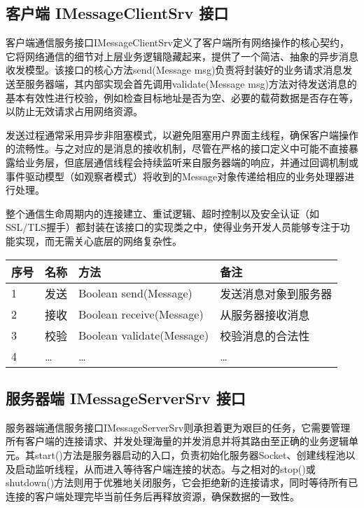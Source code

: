 \documentclass[a4paper]{ctexart}
\begin{document}
\subsection{客户端 IMessageClientSrv 接口}
客户端通信服务接口IMessageClientSrv定义了客户端所有网络操作的核心契约，它将网络通信的细节对上层业务逻辑隐藏起来，提供了一个简洁、抽象的异步消息收发模型。该接口的核心方法send(Message msg)负责将封装好的业务请求消息发送至服务器端，其内部实现会首先调用validate(Message msg)方法对待发送消息的基本有效性进行校验，例如检查目标地址是否为空、必要的载荷数据是否存在等，以防止无效请求占用网络资源。

发送过程通常采用异步非阻塞模式，以避免阻塞用户界面主线程，确保客户端操作的流畅性。与之对应的是消息的接收机制，尽管在严格的接口定义中可能不直接暴露给业务层，但底层通信线程会持续监听来自服务器端的响应，并通过回调机制或事件驱动模型（如观察者模式）将收到的Message对象传递给相应的业务处理器进行处理。

整个通信生命周期内的连接建立、重试逻辑、超时控制以及安全认证（如SSL/TLS握手）都封装在该接口的实现类之中，使得业务开发人员能够专注于功能实现，而无需关心底层的网络复杂性。
\begin{tabular}{llll}
    \toprule
    \textbf{序号} & \textbf{名称} & \textbf{方法}               & \textbf{备注} \\
    \midrule
    1           & 发送          & Boolean send(Message)     & 发送消息对象到服务器  \\
    2           & 接收          & Boolean receive(Message)  & 从服务器接收消息    \\
    3           & 校验          & Boolean validate(Message) & 校验消息的合法性    \\
    4           & …           & …                         & …           \\
    \bottomrule
\end{tabular}

\subsection{服务器端 IMessageServerSrv 接口}
服务器端通信服务接口IMessageServerSrv则承担着更为艰巨的任务，它需要管理所有客户端的连接请求、并发处理海量的并发消息并将其路由至正确的业务逻辑单元。其start()方法是服务器启动的入口，负责初始化服务器Socket、创建线程池以及启动监听线程，从而进入等待客户端连接的状态。与之相对的stop()或shutdown()方法则用于优雅地关闭服务，它会拒绝新的连接请求，同时等待所有已连接的客户端处理完毕当前任务后再释放资源，确保数据的一致性。
\end{document}

